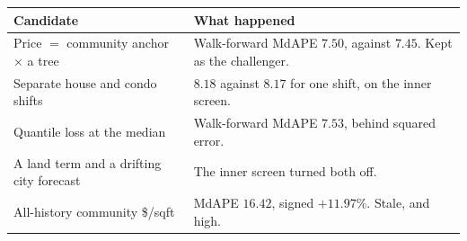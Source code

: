\documentclass[11pt]{article}
\begin{document}
\begin{center}
\small
\begin{tabular}{p{6.2cm}p{8.8cm}}
\toprule
Candidate & What happened \\
\midrule
Price \(=\) community anchor \(\times\) a tree & Walk-forward MdAPE \(7.50\), against \(7.45\). Kept as the challenger. \\
Separate house and condo shifts & \(8.18\) against \(8.17\) for one shift, on the inner screen. \\
Quantile loss at the median & Walk-forward MdAPE \(7.53\), behind squared error. \\
A land term and a drifting city forecast & The inner screen turned both off. \\
All-history community \$/sqft & MdAPE \(16.42\), signed \(+11.97\%\). Stale, and high. \\
\bottomrule
\end{tabular}
\end{center}
\end{document}
